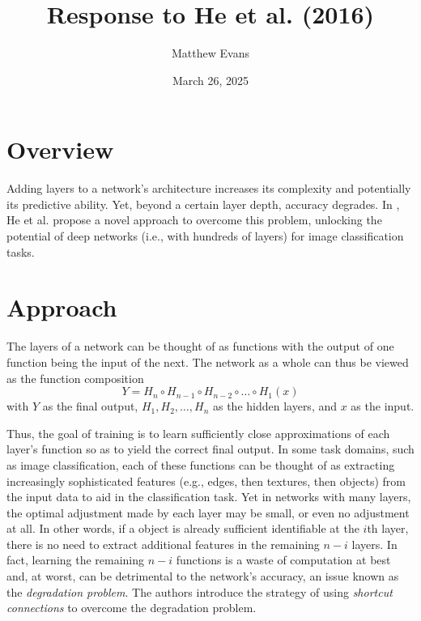 \documentclass[10pt]{article}
\title{
    Response to He et al. (2016) \\
}
\author{Matthew Evans}
\date{March 26, 2025}
\begin{document}
\maketitle

\section*{Overview}
Adding layers to a network's architecture increases its complexity and potentially its predictive ability. Yet, beyond a certain layer depth, accuracy degrades. In \cite{7780459},  He et al. propose a novel approach to overcome this problem, unlocking the potential of deep networks (i.e., with hundreds of layers) for image classification tasks.


\section*{Approach}

The layers of a network can be thought of as functions with the output of one function being the input of the next. The network as a whole can thus be viewed as the function composition
\[
    Y = H_n \circ H_{n-1}\circ H_{n-2} \circ \dots \circ H_{1}(x)
\]
with \(Y\) as the final output, \(H_1, H_2, \dots, H_{n}\) as the hidden layers, and \(x\) as the input.

Thus, the goal of training is to learn sufficiently close approximations of each layer's function so as to yield the correct final output. In some task domains, such as image classification, each of these functions can be thought of as extracting increasingly sophisticated features (e.g., edges, then textures, then objects) from the input data to aid in the classification task. Yet in networks with many layers, the optimal adjustment made by each layer may be small, or even no adjustment at all. In other words, if a object is already sufficient identifiable at the \(i\)th layer, there is no need to extract additional features in the remaining \(n-i\) layers. In fact, learning the remaining \(n-i\) functions is a waste of computation at best and, at worst, can be detrimental to the network's accuracy, an issue known as the \textit{degradation problem}. The authors introduce the strategy of using \textit{shortcut connections} to overcome the degradation problem.
\end{document}
